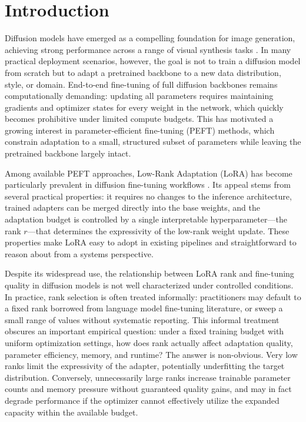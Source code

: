 \documentclass[pdflatex,sn-mathphys-num]{Springer_format/sn-jnl}
\begin{document}
\newpage

  
  \section{Introduction}
  \label{sec:intro}

Diffusion models have emerged as a compelling foundation for image generation, achieving
strong performance across a range of visual synthesis tasks \cite{ho2020ddpm,
peebles2023dit}. In many practical deployment scenarios, however, the goal is not to train
a diffusion model from scratch but to adapt a pretrained backbone to a new data
distribution, style, or domain. End-to-end fine-tuning of full diffusion backbones remains
computationally demanding: updating all parameters requires maintaining gradients and
optimizer states for every weight in the network, which quickly becomes prohibitive under
limited compute budgets. This has motivated a growing interest in parameter-efficient
fine-tuning (PEFT) methods, which constrain adaptation to a small, structured subset of
parameters while leaving the pretrained backbone largely intact.

Among available PEFT approaches, Low-Rank Adaptation (LoRA) has become particularly
prevalent in diffusion fine-tuning workflows \cite{hu2022lora}. Its appeal stems from
several practical properties: it requires no changes to the inference architecture, trained
adapters can be merged directly into the base weights, and the adaptation budget is
controlled by a single interpretable hyperparameter---the rank $r$---that determines the
expressivity of the low-rank weight update. These properties make LoRA easy to adopt in
existing pipelines and straightforward to reason about from a systems perspective.

Despite its widespread use, the relationship between LoRA rank and fine-tuning quality
in diffusion models is not well characterized under controlled conditions. In practice,
rank selection is often treated informally: practitioners may default to a fixed rank
borrowed from language model fine-tuning literature, or sweep a small range of values
without systematic reporting. This informal treatment obscures an important empirical
question: under a fixed training budget with uniform optimization settings, how does rank
actually affect adaptation quality, parameter efficiency, memory, and runtime? The answer
is non-obvious. Very low ranks limit the expressivity of the adapter, potentially
underfitting the target distribution. Conversely, unnecessarily large ranks increase
trainable parameter counts and memory pressure without guaranteed quality gains, and may
in fact degrade performance if the optimizer cannot effectively utilize the expanded
capacity within the available budget.
\end{document}
